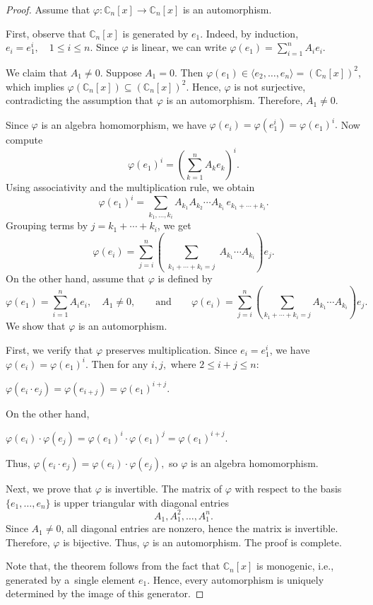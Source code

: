 \documentclass{jonasart}
\begin{document}
	\begin{proof}
		Assume that $\varphi: \mathbb{C}_n [x] \to \mathbb{C}_n [x]$ is an automorphism.

		First, observe that $\mathbb{C}_n [x]$ is generated by $e_1$. Indeed, by induction,
		$e_i = e_1^i, \quad 1 \le i \le n.$
		Since $\varphi$ is linear, we can write
		$\varphi(e_1 ) = \sum_{i=1}^n A_i e_i.$

		We claim that $A_1 \ne 0$. Suppose $A_1 = 0$. Then $\varphi(e_1 ) \in \langle e_2, \dots, e_n \rangle = (\mathbb{C}_n [x])^2$, which implies
		$\varphi(\mathbb{C}_n [x]) \subseteq (\mathbb{C}_n [x])^2.$
		Hence, $\varphi$ is not surjective, contradicting the assumption that $\varphi$ is an automorphism. Therefore, $A_1 \ne 0$.

		Since $\varphi$ is an algebra homomorphism, we have
		$\varphi(e_i ) = \varphi(e_1^i ) = \varphi(e_1 )^i.$
		Now compute
		\[
			\varphi(e_1 )^i = \left( \sum_{k=1}^n A_k e_k \right)^i.
		\]
		Using associativity and the multiplication rule, we obtain
		\[
			\varphi(e_1 )^i =
			\sum_{k_1,\dots,k_i}
			A_{k_1} A_{k_2} \cdots A_{k_i} \, e_{k_1 +\cdots+k_i}.
		\]
		Grouping terms by $j = k_1 + \cdots + k_i$, we get
		\[
			\varphi(e_i )
			=
			\sum_{j=i}^n
			\left(
			\sum_{\substack{k_1 +\cdots+k_i =j}}
			A_{k_1} \cdots A_{k_i}
			\right)
			e_j.
		\]
		On the other hand, assume that $\varphi$ is defined by
		\[
			\varphi(e_1 ) = \sum_{i=1}^n A_i e_i, \quad A_1 \ne 0, \qquad \text{and} \qquad
			\varphi(e_i ) = \sum_{j=i}^n \left( \sum_{k_1 +\cdots+k_i =j} A_{k_1} \cdots A_{k_i} \right) e_j.
		\]
		We show that $\varphi$ is an automorphism.

		First, we verify that $\varphi$ preserves multiplication. Since $e_i = e_1^i$, we have
		$\varphi(e_i ) = \varphi(e_1 )^i.$
		Then for any $i,j,$ where $2 \le i+j \le n:$
		\begin{center}
			$\varphi(e_i\cdot e_j )
			=
			\varphi(e_{i+j})
			=
			\varphi(e_1 )^{i+j}.$
		\end{center}
		On the other hand,
		\begin{center}
			$\varphi(e_i )\cdot \varphi(e_j )
			=
			\varphi(e_1 )^i \cdot \varphi(e_1 )^j
			=
			\varphi(e_1 )^{i+j}.$
		\end{center}
		Thus,
		$\varphi(e_i\cdot e_j ) = \varphi(e_i )\cdot \varphi(e_j ),$
		so $\varphi$ is an algebra homomorphism.

		Next, we prove that $\varphi$ is invertible. The matrix of $\varphi$ with respect to the basis $\{e_1, \dots, e_n\}$ is upper triangular with diagonal entries
		\[
			A_1, A_1^2, \dots, A_1^n.
		\]
		Since $A_1 \ne 0$, all diagonal entries are nonzero, hence the matrix is invertible. Therefore, $\varphi$ is bijective. Thus, $\varphi$ is an automorphism. The proof is complete.

		Note that, the theorem follows from the fact that $\mathbb{C}_n [x]$ is monogenic, i.e., generated by a~single element $e_1$. Hence, every automorphism is uniquely determined by the image of this generator.
	\end{proof}
\end{document}
